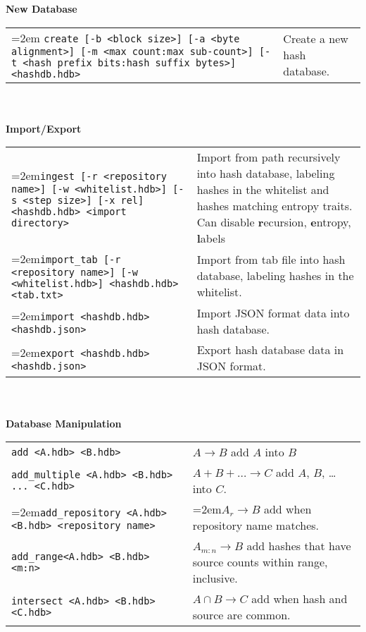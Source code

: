 \begin{footnotesize}
\textbf{New Database} \\
\begin{tabular}{p{3.6 in} p{3.0 in}}
\hangindent=2em \texttt{create [-b <block size>] [-a <byte alignment>] [-m <max count:max sub-count>] [-t <hash prefix bits:hash suffix bytes>] <hashdb.hdb>} &
Create a new hash database.\\
\end{tabular}
\\
\\
\textbf{Import/Export} \\
\begin{tabular}{p{3.6 in} p{3.0 in}}
\hangindent=2em\texttt{ingest [-r <repository name>] [-w <whitelist.hdb>] [-s <step size>] [-x rel] <hashdb.hdb> <import directory>} &
Import from path recursively into hash database, labeling hashes in the whitelist and hashes matching entropy traits.  Can disable \textbf{r}ecursion, \textbf{e}ntropy, \textbf{l}abels \\
\hangindent=2em\texttt{import\_tab [-r <repository name>] [-w <whitelist.hdb>] <hashdb.hdb> <tab.txt>} &
Import from tab file into hash database, labeling hashes in the whitelist.\\
\hangindent=2em\texttt{import <hashdb.hdb> <hashdb.json>} &
Import JSON format data into hash database.\\
\hangindent=2em\texttt{export <hashdb.hdb> <hashdb.json>} &
Export hash database data in JSON format.\\
\end{tabular}
\\
\\
\textbf{Database Manipulation} \\
\begin{tabular}{p{3.6 in} p{3.0 in}}
\texttt{add <A.hdb> <B.hdb>} & $A \rightarrow B$ add $A$ into $B$ \\
\texttt{add\_multiple <A.hdb> <B.hdb> ... <C.hdb>} & $A + B + \ldots \rightarrow C$ add $A$, $B$, \ldots into $C$.\\
\hangindent=2em\texttt{add\_repository <A.hdb> <B.hdb> <repository name>} & \hangindent=2em$A_r \rightarrow B$ add when repository name matches.\\
\texttt{add\_range<A.hdb> <B.hdb> <m:n>} & $A_{m:n} \rightarrow B$ add hashes that have source counts within range, inclusive.\\
\texttt{intersect <A.hdb> <B.hdb> <C.hdb>} & $A \cap B \rightarrow C$ add when hash and source are common.\\

\end{tabular}
\end{footnotesize}
